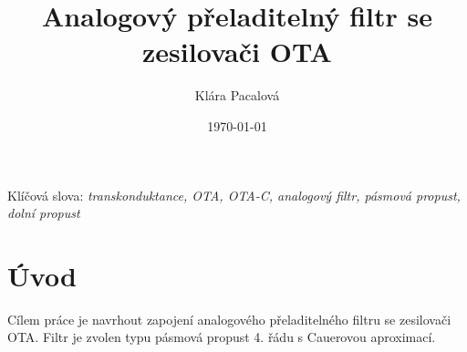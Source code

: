 \documentclass[twoside]{article}
\title{Analogový přeladitelný filtr se zesilovači OTA}
\author{Klára Pacalová}
\date{\today}
\begin{document}
\def\MapleOutput#1{{\begin{center}\begin{math}\color{MapleBlue}{#1}\end{math}\end{center}}}

\maketitle

Klíčová slova: \textit{transkonduktance, OTA, OTA-C, analogový filtr, pásmová propust, dolní propust}
\section{Úvod}
\noindent Cílem práce je navrhout zapojení analogového přeladitelného filtru se zesilovači OTA. Filtr je zvolen typu pásmová propust 4. řádu s Cauerovou aproximací.
\end{document}
